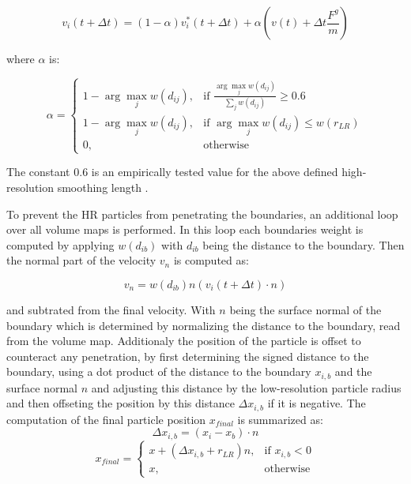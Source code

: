 \documentclass[intern]{cgMA}
\begin{document}
    \begin{equation}
        v_i(t + \Delta t)  = (1 - \alpha)v_i^*(t + \Delta t) + \alpha(v(t) + \Delta t \frac{F^g}{m})
    \end{equation}

    where $\alpha$ is:

    \begin{equation}
        \alpha = 
        \begin{cases}
            1 - \arg \max_j w(d_{ij}),& \text{if } \frac{\arg \max_j w(d_{ij})}{\sum_j w(d_{ij})} \geq 0.6 \\
            1 - \arg \max_j w(d_{ij}),& \text{if } \arg \max_j w(d_{ij}) \leq w(r_{LR}) \\
            0,              & \text{otherwise}
        \end{cases}
    \end{equation}

    The constant $0.6$ is an empirically tested value for the above defined high-resolution smoothing length \cite{10.2312:PE:vriphys:vriphys12:053-060}. 
    
    To prevent the HR particles from penetrating the boundaries, an additional loop over all volume maps is performed. In this loop each boundaries weight is computed by applying $w(d_{ib})$ with $d_{ib}$ being the distance to the boundary. Then the normal part of the velocity $v_n$ is computed as:

    \begin{equation}
        v_n = w(d_{ib}) n (v_i(t + \Delta t) \cdot n)
    \end{equation}

    and subtrated from the final velocity. With $n$ being the surface normal of the boundary which is determined by normalizing the distance to the boundary, read from the volume map.
    Additionaly the position of the particle is offset to counteract any penetration, by first determining the signed distance to the boundary, using a dot product of the distance to the boundary $x_{i,b}$ and the surface normal $n$ and adjusting this distance by the low-resolution particle radius and then offseting the position by this distance $\Delta x_{i,b}$ if it is negative. The computation of the final particle position $x_{final}$ is summarized as:
    \begin{equation}
        \Delta x_{i,b} = (x_i - x_b) \cdot n
    \end{equation}
    \begin{equation}
        x_{final} = 
        \begin{cases}
            x + (\Delta x_{i,b} + r_{LR}) n,     & \text{if } x_{i,b} < 0 \\
            x,              & \text{otherwise}
        \end{cases}
    \end{equation}
    
\end{document}
